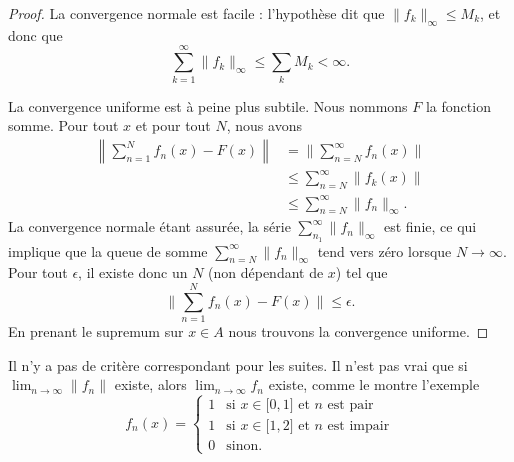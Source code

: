 \begin{proof}
    La convergence normale est facile : l'hypothèse dit que \( \| f_k \|_{\infty}\leq M_k\), et donc que
    \begin{equation}
        \sum_{k=1}^{\infty}\| f_k \|_{\infty}\leq \sum_kM_k<\infty.
    \end{equation}
    
    La convergence uniforme est à peine plus subtile. Nous nommons \( F\) la fonction somme. Pour tout \( x\) et pour tout \( N\), nous avons
    \begin{subequations}
        \begin{align}
            \left\| \sum_{n=1}^Nf_n(x)-F(x) \right\|&=\| \sum_{n=N}^{\infty}f_n(x) \|\\
            &\leq\sum_{n=N}^{\infty}\| f_k(x) \|\\
            &\leq \sum_{n=N}^{\infty}\| f_n \|_{\infty}.
        \end{align}
    \end{subequations}
    La convergence normale étant assurée, la série \( \sum_{n_1}^{\infty}\| f_n \|_{\infty}\) est finie, ce qui implique que la queue de somme \( \sum_{n=N}^{\infty}\| f_n \|_{\infty}\) tend vers zéro lorsque \( N\to \infty\). Pour tout \( \epsilon\), il existe donc un \( N\) (non dépendant de \( x\)) tel que
    \begin{equation}
        \| \sum_{n=1}^Nf_n(x)-F(x) \|\leq \epsilon.
    \end{equation}
    En prenant le supremum sur \( x\in A\) nous trouvons la convergence uniforme.
\end{proof}

\begin{remark}
    Il n'y a pas de critère correspondant pour les suites. Il n'est pas vrai que si \( \lim_{n\to \infty}\| f_n \| \) existe, alors \( \lim_{n\to \infty} f_n\) existe, comme le montre l'exemple
    \begin{equation}
        f_n(x)=\begin{cases}
            1    &   \text{si } x\in\mathopen[ 0 , 1 \mathclose]\text{ et } n\text{ est pair}\\
            1    &    \text{si } x\in\mathopen[ 1 , 2 \mathclose]\text{ et } n\text{ est impair}\\
             0   &    \text{sinon.}
        \end{cases}
    \end{equation}
\end{remark}

